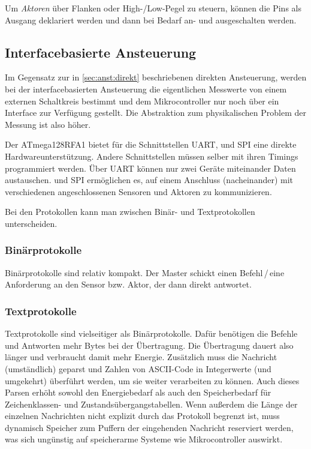 	Um \emph{Aktoren} über Flanken oder High-/Low-Pegel zu steuern, können
	die Pins als Ausgang deklariert werden und dann bei Bedarf an- und
	ausgeschalten werden.


\subsection{Interfacebasierte Ansteuerung}
	Im Gegensatz zur in \autoref{sec:anst:direkt} beschriebenen direkten
	Ansteuerung, werden bei der interfacebasierten Ansteuerung die
	eigentlichen Messwerte von einem externen Schaltkreis bestimmt und
	dem Mikrocontroller nur noch über ein Interface zur Verfügung gestellt.
	Die Abstraktion zum physikalischen Problem der Messung ist also höher.

	Der ATmega128RFA1 bietet für die Schnittstellen UART, \ItC und SPI
	eine direkte Hardwareunterstützung.  Andere Schnittstellen müssen
	selber mit ihren Timings programmiert werden.  Über UART können nur
	zwei Geräte miteinander Daten austauschen. \ItC und SPI ermöglichen es,
	auf einem Anschluss (nacheinander) mit verschiedenen angeschlossenen
	Sensoren und Aktoren zu kommunizieren.

	Bei den Protokollen kann man zwischen Binär- und Textprotokollen
	unterscheiden.
\subsubsection{Binärprotokolle}
	Binärprotokolle sind relativ kompakt.  Der Master schickt einen
	Befehl\,/\,eine Anforderung an den Sensor bzw. Aktor, der dann direkt
	antwortet.


\subsubsection{Textprotokolle}
	Textprotokolle sind vielseitiger als Binärprotokolle.	Dafür
	benötigen die Befehle und Antworten mehr Bytes bei der Übertragung.
	Die Übertragung dauert also länger und verbraucht damit mehr Energie.
	Zusätzlich muss die Nachricht (umständlich) geparst und Zahlen von
	ASCII-Code in Integerwerte (und umgekehrt) überführt werden, um sie
	weiter verarbeiten zu können.	Auch dieses Parsen erhöht sowohl
	den Energiebedarf als auch den Speicherbedarf für Zeichenklassen-
	und Zustandsübergangstabellen.  Wenn außerdem die Länge der
	einzelnen Nachrichten nicht explizit durch das Protokoll begrenzt
	ist, muss dynamisch Speicher zum Puffern der eingehenden Nachricht
	reserviert werden, was sich ungünstig auf speicherarme Systeme wie
	Mikrocontroller auswirkt.


